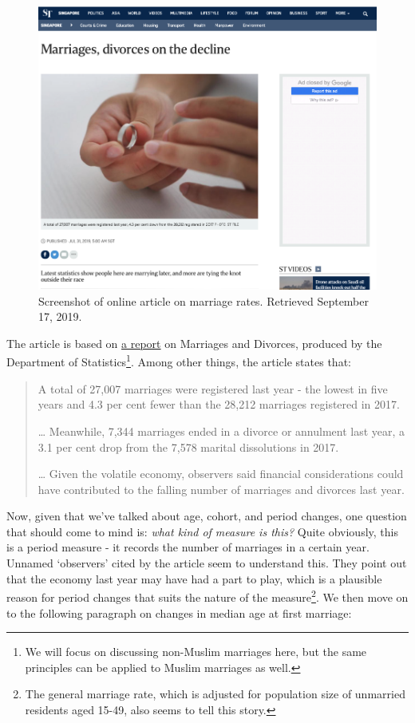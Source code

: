 \documentclass[openany]{book}
\let\rmarkdownfootnote\footnote%
\def\footnote{\protect\rmarkdownfootnote}
\begin{document}
\begin{figure}

{\centering \includegraphics[width=0.8\linewidth]{images/apc/apc_marriage} 

}

\caption{Screenshot of online article on marriage rates. Retrieved September 17, 2019.}\label{fig:st-apcmarriage}
\end{figure}

The article is based on
\href{https://www.singstat.gov.sg/-/media/files/publications/population/smd2018.pdf}{a
report} on Marriages and Divorces, produced by the Department of
Statistics\footnote{We will focus on discussing non-Muslim marriages
  here, but the same principles can be applied to Muslim marriages as
  well.}. Among other things, the article states that:

\begin{quote}
A total of 27,007 marriages were registered last year - the lowest in
five years and 4.3 per cent fewer than the 28,212 marriages registered
in 2017.

\ldots{} Meanwhile, 7,344 marriages ended in a divorce or annulment last
year, a 3.1 per cent drop from the 7,578 marital dissolutions in 2017.

\ldots{} Given the volatile economy, observers said financial
considerations could have contributed to the falling number of marriages
and divorces last year.
\end{quote}

Now, given that we've talked about age, cohort, and period changes, one
question that should come to mind is: \emph{what kind of measure is
this?} Quite obviously, this is a period measure - it records the number
of marriages in a certain year. Unnamed `observers' cited by the article
seem to understand this. They point out that the economy last year may
have had a part to play, which is a plausible reason for period changes
that suits the nature of the measure\footnote{The general marriage rate,
  which is adjusted for population size of unmarried residents aged
  15-49, also seems to tell this story.}. We then move on to the
following paragraph on changes in median age at first marriage:
\end{document}
